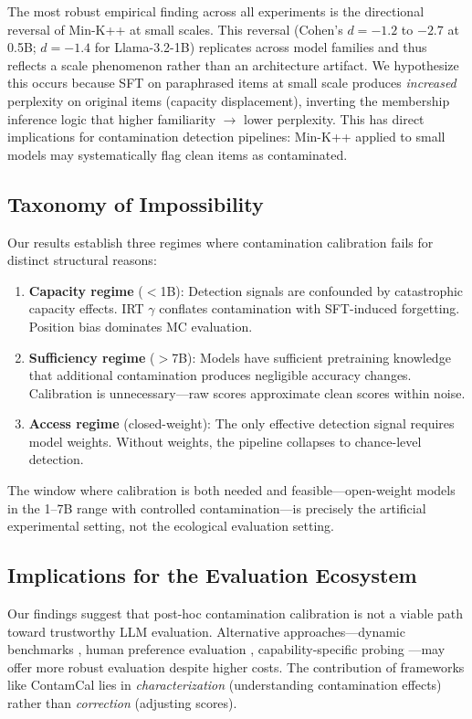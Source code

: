 \documentclass[11pt,a4paper]{article}
\begin{document}
The most robust empirical finding across all experiments is the directional reversal of Min-K++ at small scales. This reversal (Cohen's $d = -1.2$ to $-2.7$ at 0.5B; $d = -1.4$ for Llama-3.2-1B) replicates across model families and thus reflects a scale phenomenon rather than an architecture artifact. We hypothesize this occurs because SFT on paraphrased items at small scale produces \emph{increased} perplexity on original items (capacity displacement), inverting the membership inference logic that higher familiarity $\rightarrow$ lower perplexity. This has direct implications for contamination detection pipelines: Min-K++ applied to small models may systematically flag clean items as contaminated.

\subsection{Taxonomy of Impossibility}

Our results establish three regimes where contamination calibration fails for distinct structural reasons:

\begin{enumerate}
    \item \textbf{Capacity regime} ($<$1B): Detection signals are confounded by catastrophic capacity effects. IRT $\gamma$ conflates contamination with SFT-induced forgetting. Position bias dominates MC evaluation.
    \item \textbf{Sufficiency regime} ($>$7B): Models have sufficient pretraining knowledge that additional contamination produces negligible accuracy changes. Calibration is unnecessary---raw scores approximate clean scores within noise.
    \item \textbf{Access regime} (closed-weight): The only effective detection signal requires model weights. Without weights, the pipeline collapses to chance-level detection.
\end{enumerate}

The window where calibration is both needed and feasible---open-weight models in the 1--7B range with controlled contamination---is precisely the artificial experimental setting, not the ecological evaluation setting.

\subsection{Implications for the Evaluation Ecosystem}

Our findings suggest that post-hoc contamination calibration is not a viable path toward trustworthy LLM evaluation. Alternative approaches---dynamic benchmarks \citep{white2024livebench}, human preference evaluation \citep{zheng2023judging}, capability-specific probing \citep{liang2023holistic}---may offer more robust evaluation despite higher costs. The contribution of frameworks like ContamCal lies in \emph{characterization} (understanding contamination effects) rather than \emph{correction} (adjusting scores).
\end{document}
